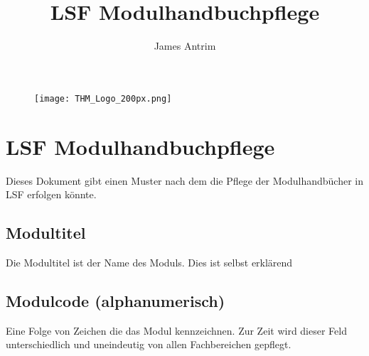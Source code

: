 \documentclass[]{report}
\begin{document}
\title{LSF Modulhandbuchpflege}
\author{James Antrim}

\begin{figure}
\centering
\texttt{[image: THM\_Logo\_200px.png]}
\maketitle
\end{figure}

\newpage

\chapter{LSF Modulhandbuchpflege}

Dieses Dokument gibt einen Muster nach dem die Pflege der Modulhandbücher in LSF erfolgen könnte.

\section{Modultitel}

Die Modultitel ist der Name des Moduls. Dies ist selbst erklärend

\section{Modulcode (alphanumerisch)}

Eine Folge von Zeichen die das Modul kennzeichnen. Zur Zeit wird dieser Feld unterschiedlich und uneindeutig von allen Fachbereichen gepflegt.
\end{document}
